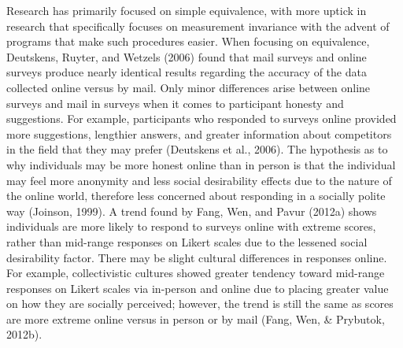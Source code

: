 \documentclass[english,man, mask]{apa6}
\theoremstyle{definition}
\theoremstyle{definition}
\theoremstyle{definition}
\theoremstyle{remark}
\begin{document}
Research has primarily focused on simple equivalence, with more uptick
in research that specifically focuses on measurement invariance with the
advent of programs that make such procedures easier. When focusing on
equivalence, Deutskens, Ruyter, and Wetzels (2006) found that mail
surveys and online surveys produce nearly identical results regarding
the accuracy of the data collected online versus by mail. Only minor
differences arise between online surveys and mail in surveys when it
comes to participant honesty and suggestions. For example, participants
who responded to surveys online provided more suggestions, lengthier
answers, and greater information about competitors in the field that
they may prefer (Deutskens et al., 2006). The hypothesis as to why
individuals may be more honest online than in person is that the
individual may feel more anonymity and less social desirability effects
due to the nature of the online world, therefore less concerned about
responding in a socially polite way (Joinson, 1999). A trend found by
Fang, Wen, and Pavur (2012a) shows individuals are more likely to
respond to surveys online with extreme scores, rather than mid-range
responses on Likert scales due to the lessened social desirability
factor. There may be slight cultural differences in responses online.
For example, collectivistic cultures showed greater tendency toward
mid-range responses on Likert scales via in-person and online due to
placing greater value on how they are socially perceived; however, the
trend is still the same as scores are more extreme online versus in
person or by mail (Fang, Wen, \& Prybutok, 2012b).
\end{document}
